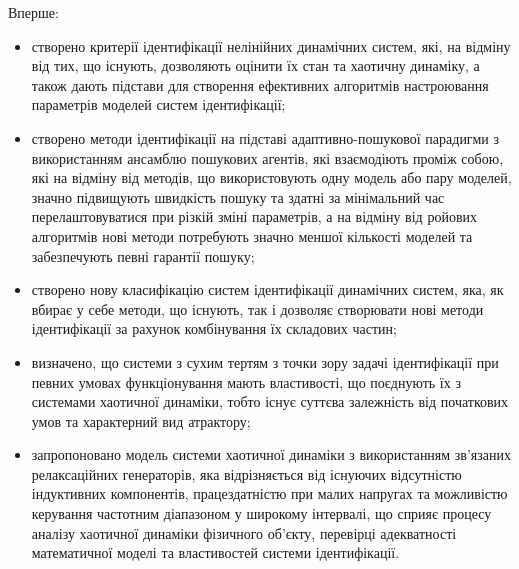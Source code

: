 \noindent
Вперше:
%
\begin{itemize}

  \item
  створено критерії ідентифікації нелінійних динамічних систем,
  які, на відміну від тих, що існують, дозволяють оцінити їх стан та
  хаотичну динаміку, а також дають підстави для створення ефективних алгоритмів
  настроювання параметрів моделей систем ідентифікації;

  \item
  створено методи ідентифікації на підставі
  адаптивно-пошукової парадигми з використанням ансамблю пошукових агентів,
  які взаємодіють проміж собою, які на відміну від методів, що використовують
  одну модель або пару моделей, значно підвищують швидкість пошуку та
  здатні за мінімальний час  перелаштовуватися при різкій зміні параметрів, а на
  відміну від ройових алгоритмів нові методи потребують значно меншої
  кількості моделей та забезпечують певні гарантії пошуку;

  \item
  створено нову класифікацію систем ідентифікації динамічних систем,
  яка, як вбирає у себе методи, що існують, так і дозволяє
  створювати нові методи ідентифікації за рахунок
  комбінування їх складових частин;

  \item
   визначено, що системи з сухим тертям з точки зору задачі ідентифікації
   при певних  умовах функціонування
   мають властивості, що поєднують їх з системами хаотичної динаміки, тобто існує
   суттєва залежність від початкових
   умов та характерний вид атрактору; %

  \item
   запропоновано модель системи хаотичної динаміки
   з використанням зв'язаних релаксаційних генераторів,
   яка відрізняється від існуючих відсутністю індуктивних компонентів,
   працездатністю при малих напругах та можливістю
   керування частотним діапазоном у широкому інтервалі,
   що сприяє процесу аналізу хаотичної динаміки
   фізичного об'єкту, перевірці адекватності математичної моделі
   та властивостей системи ідентифікації.
\end{itemize}

